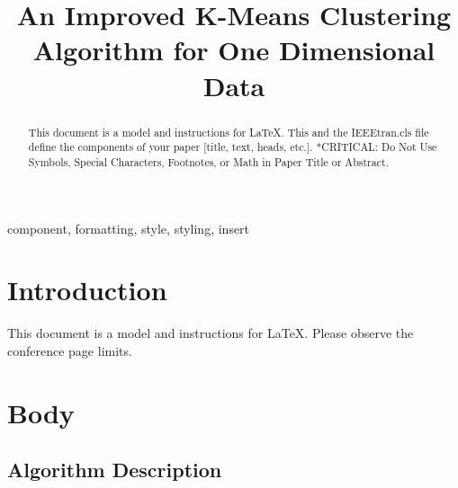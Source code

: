 \documentclass[conference]{IEEEtran}
\begin{document}
\title{An Improved K-Means Clustering Algorithm for One Dimensional Data}

\author{
\and
{}
\and
{}
}

\maketitle

\begin{abstract}
This document is a model and instructions for \LaTeX.
This and the IEEEtran.cls file define the components of your paper [title, text, heads, etc.]. *CRITICAL: Do Not Use Symbols, Special Characters, Footnotes, 
or Math in Paper Title or Abstract.
\end{abstract}

\begin{IEEEkeywords}
component, formatting, style, styling, insert
\end{IEEEkeywords}

\section{Introduction}
This document is a model and instructions for \LaTeX.
Please observe the conference page limits. 

\section{Body}

\subsection{Algorithm Description}
\end{document}
